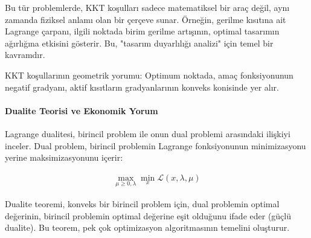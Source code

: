 Bu tür problemlerde, KKT koşulları sadece matematiksel bir araç değil, aynı zamanda fiziksel anlamı olan bir çerçeve sunar. Örneğin, gerilme kısıtına ait Lagrange çarpanı, ilgili noktada birim gerilme artışının, optimal tasarımın ağırlığına etkisini gösterir. Bu, "tasarım duyarlılığı analizi" için temel bir kavramdır.

\begin{marginfigure}
\centering
{}
\caption{KKT koşullarının geometrik yorumu: Optimum noktada, amaç fonksiyonunun negatif gradyanı, aktif kısıtların gradyanlarının konveks konisinde yer alır.}
\label{fig:kkt_geometry}
\end{marginfigure}

\paragraph{Dualite Teorisi ve Ekonomik Yorum}
Lagrange dualitesi, birincil problem ile onun dual problemi arasındaki ilişkiyi inceler. Dual problem, birincil problemin Lagrange fonksiyonunun minimizasyonu yerine maksimizasyonunu içerir:

\begin{equation}
\begin{aligned}
\max_{\mu \geq 0, \lambda} \min_{x} \mathcal{L}(x,\lambda,\mu)
\end{aligned}
\end{equation}

Dualite teoremi, konveks bir birincil problem için, dual problemin optimal değerinin, birincil problemin optimal değerine eşit olduğunu ifade eder (güçlü dualite). Bu teorem, pek çok optimizasyon algoritmasının temelini oluşturur.

